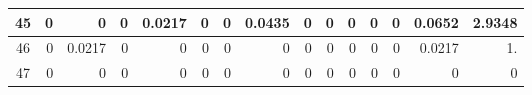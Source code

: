 \begin{table}[hb!]
\begin{adjustbox}{width = \textwidth, center}
\begin{tabular}{|c|r|r|r|r|r|r|r|r|r|r|r|r|r|r|}
        \rowcolor[HTML]{FFFFFF} 
        \cellcolor[HTML]{CFE2F3}45                                  & 0                                              & 0                                              & 0                                              & \cellcolor[HTML]{C7E9D8}0.0217                 & 0                                              & 0                                              & \cellcolor[HTML]{8FD2B1}0.0435                 & 0                                               & 0                                               & 0                                               & 0                                               & 0                                               & \cellcolor[HTML]{D9D2E9}0.0652                                                  & \cellcolor[HTML]{D9D2E9}2.9348                                                        \\ \hline
        \rowcolor[HTML]{FFFFFF} 
        \cellcolor[HTML]{CFE2F3}46                                  & 0                                              & \cellcolor[HTML]{C7E9D8}0.0217                 & 0                                              & 0                                              & 0                                              & 0                                              & 0                                              & 0                                               & 0                                               & 0                                               & 0                                               & 0                                               & \cellcolor[HTML]{D9D2E9}0.0217                                                  & \cellcolor[HTML]{D9D2E9}1.                                                            \\ \hline
        \rowcolor[HTML]{FFFFFF} 
        \cellcolor[HTML]{CFE2F3}47                                  & 0                                              & 0                                              & 0                                              & 0                                              & 0                                              & 0                                              & 0                                              & 0                                               & 0                                               & 0                                               & 0                                               & 0                                               & \cellcolor[HTML]{D9D2E9}0                                                       & \cellcolor[HTML]{D9D2E9}0                                                             \\ \hline

\end{tabular}
\end{adjustbox}
\end{table}
